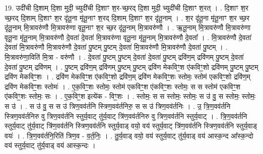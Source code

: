 \documentclass[17pt]{extarticle}
\begin{document}
19. उदी॑ची दि॒शाम् दि॒शा मुदी॒ च्युदी॑ची दि॒शाꣳ श॒र-च्छ॒रद् दि॒शा मुदी॒ च्युदी॑ची दि॒शाꣳ श॒रत् । . दि॒शाꣳ श॒र च्छ॒रद् दि॒शाम् दि॒शाꣳ श॒र दृ॑तू॒ना मृ॑तू॒नाꣳ श॒रद् दि॒शाम् दि॒शाꣳ श॒र दृ॑तू॒नाम् । . श॒र दृ॑तू॒ना मृ॑तू॒नाꣳ श॒र च्छ॒र दृ॑तू॒नाम् मि॒त्रावरु॑णौ मि॒त्रावरु॑णा वृतू॒नाꣳ 
श॒र च्छ॒र दृ॑तू॒नाम् मि॒त्रावरु॑णौ । . ऋ॒तू॒नाम् मि॒त्रावरु॑णौ मि॒त्रावरु॑णा वृतू॒ना मृ॑तू॒नाम् मि॒त्रावरु॑णौ दे॒वता॑ दे॒वता॑ मि॒त्रावरु॑णा वृतू॒ना मृ॑तू॒नाम् मि॒त्रावरु॑णौ दे॒वता᳚ । . मि॒त्रावरु॑णौ दे॒वता॑ दे॒वता॑ मि॒त्रावरु॑णौ मि॒त्रावरु॑णौ दे॒वता॑ पु॒ष्टम् पु॒ष्टम् दे॒वता॑ मि॒त्रावरु॑णौ मि॒त्रावरु॑णौ दे॒वता॑ पु॒ष्टम् । . मि॒त्रावरु॑णा॒विति॑ मि॒त्रा - वरु॑णौ । . दे॒वता॑ पु॒ष्टम् पु॒ष्टम् दे॒वता॑ दे॒वता॑ पु॒ष्टम् द्रवि॑ण॒म् द्रवि॑णम् पु॒ष्टम् दे॒वता॑ दे॒वता॑ पु॒ष्टम् द्रवि॑णम् । . पु॒ष्टम् द्रवि॑ण॒म् द्रवि॑णम् पु॒ष्टम् पु॒ष्टम् द्रवि॑ण मेकविꣳ॒॒श ए॑कविꣳ॒॒शो द्रवि॑णम् पु॒ष्टम् पु॒ष्टम् द्रवि॑ण मेकविꣳ॒॒शः । . द्रवि॑ण मेकविꣳ॒॒श ए॑कविꣳ॒॒शो द्रवि॑ण॒म् द्रवि॑ण मेकविꣳ॒॒शः स्तोमः॒ स्तोम॑ एकविꣳ॒॒शो द्रवि॑ण॒म् द्रवि॑ण मेकविꣳ॒॒शः स्तोमः॑ । . ए॒क॒विꣳ॒॒शः स्तोमः॒ स्तोम॑ एकविꣳ॒॒श ए॑कविꣳ॒॒शः स्तोमः॒ स स स्तोम॑ एकविꣳ॒॒श ए॑कविꣳ॒॒शः स्तोमः॒ सः । . ए॒क॒विꣳ॒॒श इत्ये॑क - विꣳ॒॒शः । . स्तोमः॒ स स स्तोमः॒ स्तोमः॒ स उ॑ वु॒ स स्तोमः॒ स्तोमः॒ स उ॑ । . स उ॑ वु॒ स स उ॑ त्रिण॒वव॑र्तनि स्त्रिण॒वव॑र्तनिरु॒ स स उ॑ त्रिण॒वव॑र्तनिः । . उ॒ त्रि॒ण॒वव॑र्तनि स्त्रिण॒वव॑र्तनिरु वु त्रिण॒वव॑र्तनि स्तुर्य॒वाट् तु॑र्य॒वाट् त्रि॑ण॒वव॑र्तनिरु वु त्रिण॒वव॑र्तनि स्तुर्य॒वाट् । . त्रि॒ण॒वव॑र्तनि स्तुर्य॒वाट् तु॑र्य॒वाट् त्रि॑ण॒वव॑र्तनि स्त्रिण॒वव॑र्तनि स्तुर्य॒वाड् वयो॒ वय॑ स्तुर्य॒वाट् त्रि॑ण॒वव॑र्तनि स्त्रिण॒वव॑र्तनि स्तुर्य॒वाड् वयः॑ । . त्रि॒ण॒वव॑र्तनि॒रिति॑ त्रिण॒व - व॒र्त॒निः॒ । . तु॒र्य॒वाड् वयो॒ वय॑ स्तुर्य॒वाट् तु॑र्य॒वाड् वय॑ आस्क॒न्द आ᳚स्क॒न्दो वय॑ स्तुर्य॒वाट् तु॑र्य॒वाड् वय॑ आस्क॒न्दः । \newline
\end{document}
